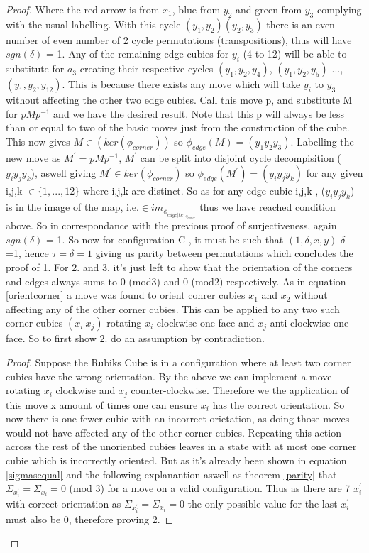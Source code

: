 \documentclass{article}
\begin{document}
\begin{proof}
Where the red arrow is from $x_1$, blue from $y_2$ and green from $y_3$ complying with the usual labelling. With this cycle $(y_1,y_2) (y_2,y_3)$ there is an even number of even number of 2 cycle permutations (transpositions), thus will have $sgn(\delta)$ = 1. Any of the remaining edge cubies for $y_i$ (4 to 12) will be able to substitute for $a_3$ creating their respective cycles $(y_1,y_2,y_4)$, $(y_1,y_2,y_5)$ ..., $(y_1,y_2,y_{12})$. This is because there exists any move which will take $y_i$ to $y_3$ without affecting the other two edge cubies. Call this move p, and substitute M for $pMp^{-1}$ and we have the desired result. Note that this p will always be less than or equal to two of the basic moves just from the construction of the cube. This now gives $M \in (ker(\phi_{corner}))$ so $\phi_{edge}(M) = (y_1 y_2 y_3)$. Labelling the new move as $M^{'}=pMp^{-1}$, $M^{'}$ can be split into disjoint cycle decompisition ($y_i y_j y_k$), aswell giving $M^{'} \in ker(\phi_{corner})$ so $\phi_{edge}(M^{'}) = (y_i y_j y_k)$ for any given i,j,k $\in \{1,...,12\}$ where i,j,k are distinct. So as for any edge cubie i,j,k , ($y_i y_j y_k$) is in the image of the map, i.e.$\in im_{\phi_{edge|ker_{\phi_{corner}}}}$ thus we have reached condition above. So in correspondance with the previous proof of surjectiveness, again $sgn(\delta)$ = 1. So now for configuration C , it must be such that $(1,\delta, x, y)$ $\delta$ =1, hence $\tau = \delta = 1$ giving us parity between permutations which concludes the proof of 1. 
For 2. and 3. it's just left to show that the orientation of the corners and edges always sums to 0 (mod3) and 0 (mod2) respectively.
As in equation \ref{orientcorner} a move was found to orient conrer cubies $x_1$ and $x_2$ without affecting any of the other corner cubies. This can be applied to any two such corner cubies $(x_i\ x_j)$ rotating $x_i$ clockwise one face and $x_j$ anti-clockwise one face. So to first show 2. do an assumption by contradiction. 
\begin{proof}
Suppose the Rubiks Cube is in a configuration where at least two corner cubies have the wrong orientation. By the above we can implement a move rotating $x_i$ clockwise and $x_j$ counter-clockwise. Therefore we the application of this move x amount of times one can ensure $x_i$ has the correct orientation. So now there is one fewer cubie with an incorrect orietation, as doing those moves would not have affected any of the other corner cubies. Repeating this action across the rest of the unoriented cubies leaves in a state with at most one corner cubie which is incorrectly oriented. But as it's already been shown in equation \ref{sigmasequal} and the following explanantion aswell as theorem \ref{parity} that $\Sigma_{x_{i}^{'}} = \Sigma_{x_{i}} = 0$ (mod 3) for a move on a valid configuration. Thus as there are 7 $x_i^{'}$ with correct orientation as $\Sigma_{x_{i}^{'}} = \Sigma_{x_{i}} = 0$ the only possible value for the last $x_i^{'}$ must also be 0, therefore proving 2.

\end{proof}
\end{proof}
\end{document}
